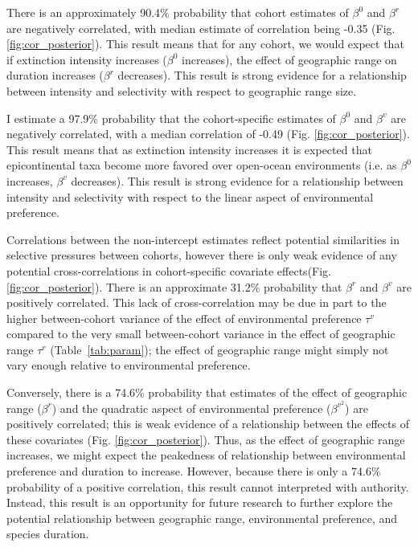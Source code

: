 \documentclass[11pt]{article}
\begin{document}
There is an approximately 90.4\% probability that cohort estimates of \(\beta^{0}\) and \(\beta^{r}\) are negatively correlated, with median estimate of correlation being -0.35 (Fig. \ref{fig:cor_posterior}). This result means that for any cohort, we would expect that if extinction intensity increases (\(\beta^{0}\) increases), the effect of geographic range on duration increases (\(\beta^{r}\) decreases). This result is strong evidence for a relationship between intensity and selectivity with respect to geographic range size.


I estimate a 97.9\% probability that the cohort-specific estimates of \(\beta^{0}\) and \(\beta^{v}\) are negatively correlated, with a median correlation of -0.49 (Fig. \ref{fig:cor_posterior}). This result means that as extinction intensity increases it is expected that epicontinental taxa become more favored over open-ocean environments (i.e. as \(\beta^{0}\) increases, \(\beta^{v}\) decreases). This result is strong evidence for a relationship between intensity and selectivity with respect to the linear aspect of environmental preference. 

Correlations between the non-intercept estimates reflect potential similarities in selective pressures between cohorts, however there is only weak evidence of any potential cross-correlations in cohort-specific covariate effects(Fig. \ref{fig:cor_posterior}). There is an approximate 31.2\% probability that \(\beta^{r}\) and \(\beta^{v}\) are positively correlated. This lack of cross-correlation may be due in part to the higher between-cohort variance of the effect of environmental preference \(\tau^{v}\) compared to the very small between-cohort variance in the effect of geographic range \(\tau^{r}\) (Table~\ref{tab:param}); the effect of geographic range might simply not vary enough relative to environmental preference. 

Conversely, there is a 74.6\% probability that estimates of the effect of geographic range (\(\beta^{r}\)) and the quadratic aspect of environmental preference (\(\beta^{v^{2}}\)) are positively correlated; this is weak evidence of a relationship between the effects of these covariates (Fig. \ref{fig:cor_posterior}). Thus, as the effect of geographic range increases, we might expect the peakedness of relationship between environmental preference and duration to increase. However, because there is only a 74.6\% probability of a positive correlation, this result cannot interpreted with authority. Instead, this result is an opportunity for future research to further explore the potential relationship between geographic range, environmental preference, and species duration.
\end{document}
